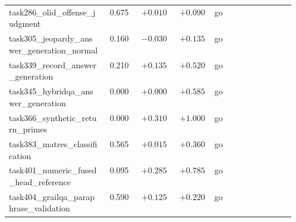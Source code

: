 \begin{longtable}{@{}p{0.34\linewidth}rrrcp{0.22\linewidth}@{}}
\scriptsize task286\_\hspace{0pt}olid\_\hspace{0pt}offense\_\hspace{0pt}judgment & \scriptsize 0.675 & \scriptsize $+0.010$ & \scriptsize $+0.090$ & \scriptsize go & \scriptsize  \\
\scriptsize task305\_\hspace{0pt}jeopardy\_\hspace{0pt}answer\_\hspace{0pt}generation\_\hspace{0pt}normal & \scriptsize 0.160 & \scriptsize $-0.030$ & \scriptsize $+0.135$ & \scriptsize go & \scriptsize  \\
\scriptsize task339\_\hspace{0pt}record\_\hspace{0pt}answer\_\hspace{0pt}generation & \scriptsize 0.210 & \scriptsize $+0.135$ & \scriptsize $+0.520$ & \scriptsize go & \scriptsize  \\
\scriptsize task345\_\hspace{0pt}hybridqa\_\hspace{0pt}answer\_\hspace{0pt}generation & \scriptsize 0.000 & \scriptsize $+0.000$ & \scriptsize $+0.585$ & \scriptsize go & \scriptsize  \\
\scriptsize task366\_\hspace{0pt}synthetic\_\hspace{0pt}return\_\hspace{0pt}primes & \scriptsize 0.000 & \scriptsize $+0.310$ & \scriptsize $+1.000$ & \scriptsize go & \scriptsize  \\
\scriptsize task383\_\hspace{0pt}matres\_\hspace{0pt}classification & \scriptsize 0.565 & \scriptsize $+0.015$ & \scriptsize $+0.360$ & \scriptsize go & \scriptsize  \\
\scriptsize task401\_\hspace{0pt}numeric\_\hspace{0pt}fused\_\hspace{0pt}head\_\hspace{0pt}reference & \scriptsize 0.095 & \scriptsize $+0.285$ & \scriptsize $+0.785$ & \scriptsize go & \scriptsize  \\
\scriptsize task404\_\hspace{0pt}grailqa\_\hspace{0pt}paraphrase\_\hspace{0pt}validation & \scriptsize 0.590 & \scriptsize $+0.125$ & \scriptsize $+0.220$ & \scriptsize go & \scriptsize  \\

\end{longtable}
